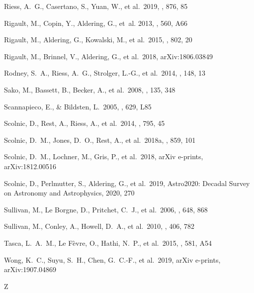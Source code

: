 \documentclass[]{aa} %
\begin{document}
\begin{thebibliography}{}
 Riess, A.~G., Casertano, S., Yuan, W., et al.\ 2019, \apj, 876, 85

Rigault, M., Copin, Y., Aldering, G., {et~al.} 2013, \aap, 560, A66

 Rigault, M., Aldering, G., Kowalski, M., et al.\ 2015, \apj, 802, 20


 Rigault, M.,
  Brinnel, V., Aldering, G., et al.\ 2018, arXiv:1806.03849

 Rodney, S.~A.,
  Riess, A.~G., Strolger, L.-G., et al.\ 2014, \aj, 148, 13 


 Sako, M., Bassett, B., Becker, A., et al.\ 2008, \aj, 135, 348

 Scannapieco, E., \& Bildsten, L.\ 2005, \apjl, 629, L85 

 Scolnic, D., Rest, A., Riess, A., et al.\ 2014, \apj, 795, 45

 Scolnic, D.~M., Jones, D.~O., Rest, A., et al.\ 2018a, \apj, 859, 101

 Scolnic, D.~M., Lochner, M., Gris, P., et al.\ 2018, arXiv e-prints, arXiv:1812.00516

 Scolnic, D., Perlmutter, S., Aldering, G., et al.\ 2019, Astro2020: Decadal Survey on Astronomy and Astrophysics, 2020, 270

 Sullivan, M., Le  Borgne, D., Pritchet, C.~J., et al.\ 2006, \apj, 648, 868 


 Sullivan, M., Conley, A., Howell, D.~A., et al.\ 2010, \mnras, 406, 782

 Tasca, L.~A.~M., Le F{\`e}vre, O., Hathi, N.~P., et al.\ 2015, \aap, 581, A54

 Wong, K.~C., Suyu, S.~H., Chen, G.~C.-F., et al.\ 2019, arXiv e-prints, arXiv:1907.04869

 Z
\end{thebibliography}
\end{document}
